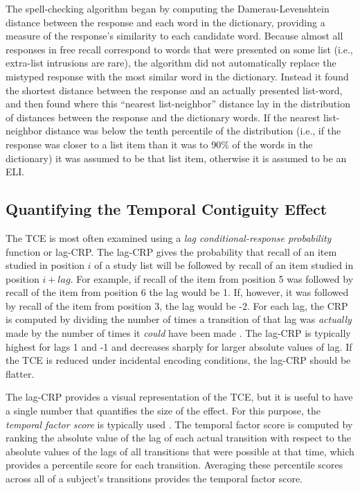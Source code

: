\documentclass[jou,natbib]{apa6} %
\begin{document}
The spell-checking algorithm began by computing the Damerau-Levenshtein distance \cite{Dame64} between the response and each word in the dictionary, providing a measure of the response's similarity to each candidate word. Because almost all responses in free recall correspond to words that were presented on some list (i.e., extra-list intrusions are rare), the algorithm did not automatically replace the mistyped response with the most similar word in the dictionary. Instead it found the shortest distance between the response and an actually presented list-word, and then found where this ``nearest list-neighbor'' distance lay in the distribution of distances between the response and the dictionary words. If the nearest list-neighbor distance was below the tenth percentile of the distribution (i.e., if the response was closer to a list item than it was to 90\% of the words in the dictionary) it was assumed to be that list item, otherwise it is assumed to be an ELI.

\subsection{Quantifying the Temporal Contiguity Effect} The TCE is most often examined using a \textit{lag conditional-response probability} function or lag-CRP. The lag-CRP gives the probability that recall of an item studied in position $i$ of a study list will be followed by recall of an item studied in position $i+lag$. For example, if recall of the item from position 5 was followed  by recall of the item from position 6 the lag would be 1. If, however, it was followed by recall of the item from position 3, the lag would be -2. For each lag, the CRP is computed by dividing the number of times a transition of that lag was \emph{actually} made by the number of times it \emph{could} have been made \citep[e.g., it could not have been made if the item $i+lag$ was already recalled;][]{Kaha96}. The lag-CRP is typically highest for lags 1 and -1 and decreases sharply for larger absolute values of lag. If the TCE is reduced under incidental encoding conditions, the lag-CRP should be flatter.

The lag-CRP provides a visual representation of the TCE, but it is useful to have a single number that quantifies the size of the effect. For this purpose, the \emph{temporal factor score} is typically used \citep{SedeEtal10,PolyEtal09}. The temporal factor score is computed by ranking the absolute value of the lag of each actual transition with respect to the absolute values of the lags of all transitions that were possible at that time, which provides a percentile score for each transition. Averaging these percentile scores across all of a subject's transitions provides the temporal factor score.
 
\end{document}
